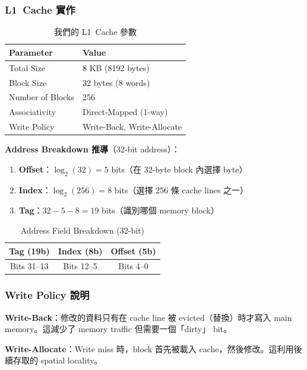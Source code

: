 \documentclass[journal]{IEEEtran}
\begin{document}
\subsubsection{L1~Cache 實作}
\begin{table}[!t]
\centering
\caption{我們的 L1~Cache 參數}
\footnotesize
\begin{tabular}{@{}ll@{}}
\toprule
\textbf{Parameter} & \textbf{Value} \\
\midrule
Total Size & 8 KB (8192 bytes) \\
Block Size & 32 bytes (8 words) \\
Number of Blocks & 256 \\
Associativity & Direct-Mapped (1-way) \\
Write Policy & Write-Back, Write-Allocate \\
\bottomrule
\end{tabular}
\end{table}

\textbf{Address Breakdown 推導}（32-bit address）：
\begin{enumerate}
    \item \textbf{Offset}：$\log_2(32) = 5$ bits（在 32-byte block 內選擇 byte）
    \item \textbf{Index}：$\log_2(256) = 8$ bits（選擇 256 條 cache lines 之一）
    \item \textbf{Tag}：$32 - 5 - 8 = 19$ bits（識別哪個 memory block）
\end{enumerate}

\begin{table}[!t]
\centering
\caption{Address Field Breakdown (32-bit)}
\label{tab:addrbreak}
\footnotesize
\begin{tabular}{ccc}
\toprule
\textbf{Tag (19b)} & \textbf{Index (8b)} & \textbf{Offset (5b)} \\
\midrule
Bits 31--13 & Bits 12--5 & Bits 4--0 \\
\bottomrule
\end{tabular}
\end{table}

\subsubsection{Write Policy 說明}
\textbf{Write-Back}：修改的資料只有在 cache line 被 evicted（替換）時才寫入 main memory。這減少了 memory traffic 但需要一個「dirty」 bit。

\textbf{Write-Allocate}：Write miss 時，block 首先被載入 cache，然後修改。這利用後續存取的 spatial locality。
\end{document}
